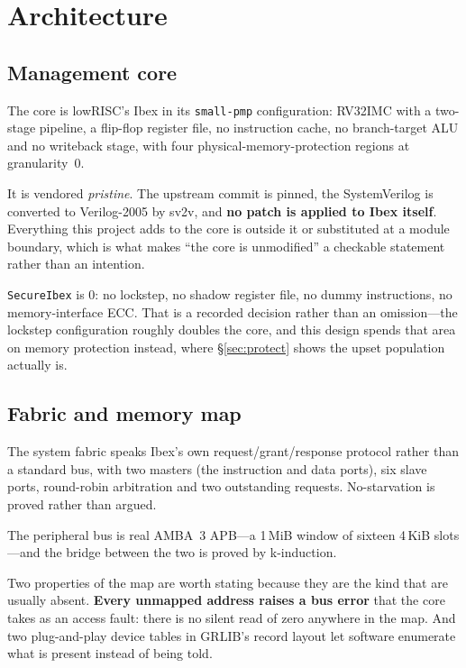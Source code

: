 \documentclass[11pt,a4paper]{article}
\begin{document}
\section{Architecture}
\label{sec:arch}

\subsection{Management core}

The core is lowRISC's Ibex in its \texttt{small-pmp} configuration:
RV32IMC with a two-stage pipeline, a flip-flop register file, no
instruction cache, no branch-target ALU and no writeback stage, with
four physical-memory-protection regions at granularity~\num{0}.

It is vendored \emph{pristine}. The upstream commit is pinned, the
SystemVerilog is converted to Verilog-2005 by sv2v, and \textbf{no patch
is applied to Ibex itself}. Everything this project adds to the core is
outside it or substituted at a module boundary, which is what makes
``the core is unmodified'' a checkable statement rather than an
intention.

\texttt{SecureIbex} is \num{0}: no lockstep, no shadow register file, no
dummy instructions, no memory-interface ECC. That is a recorded decision
rather than an omission---the lockstep configuration roughly doubles the
core, and this design spends that area on memory protection instead,
where \S\ref{sec:protect} shows the upset population actually is.

\subsection{Fabric and memory map}

The system fabric speaks Ibex's own request/grant/response protocol
rather than a standard bus, with two masters (the instruction and data
ports), six slave ports, round-robin arbitration and two outstanding
requests. No-starvation is proved rather than argued.

The peripheral bus is real AMBA~3 APB---a \num{1}\,MiB window of sixteen
\num{4}\,KiB slots---and the bridge between the two is proved by
k-induction.

Two properties of the map are worth stating because they are the kind
that are usually absent. \textbf{Every unmapped address raises a bus
error} that the core takes as an access fault: there is no silent read
of zero anywhere in the map. And two plug-and-play device tables in
GRLIB's record layout let software enumerate what is present instead of
being told.
\end{document}
